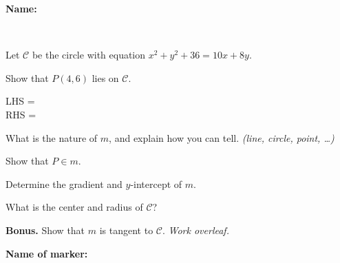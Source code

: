 \documentclass[9pt]{exam}
\begin{document}
\begin{minipage}[t]{0.7\textwidth}
\textbf{Name:} \dotfill

\


Let $\mathcal{C}$ be the circle with equation $x^2 + y^2 + 36 = 10x + 8y$. 

\end{minipage}
\begin{minipage}[t]{0.2\textwidth}
\vspace{-6mm}
\end{minipage}

\begin{questions}
\vspace{-10mm}
\question[2] Show that $P(4, 6)$ lies on $\mathcal{C}$.

\vspace{5mm}
LHS = \makebox[140mm]{\dotfill} \\

\vspace{0mm}
RHS = \makebox[140mm]{\dotfill}

\question[2] What is the nature of $m$, and explain how you can tell. \hfill \emph{(line, circle, point, \ldots)}
\fillwithdottedlines{15mm}

\question[2] Show that $P \in m$.
\fillwithdottedlines{25mm}

\question[2] Determine the gradient and $y$-intercept of $m$.
\fillwithdottedlines{25mm}

\question[2] What is the center and radius of $\mathcal{C}$?

\question \textbf{Bonus.} Show that $m$ is tangent to $\mathcal{C}$. \hfill \emph{Work overleaf.}

\end{questions}

\begin{tcolorbox}

\textbf{Name of marker:}

\begin{center}
\gradetable[h][questions]
\end{center}

\end{tcolorbox}
\end{document}
